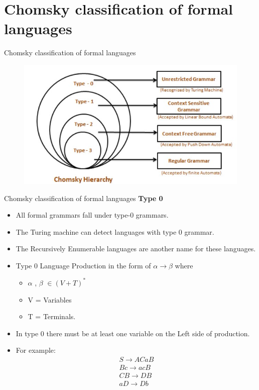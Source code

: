 \documentclass{beamer}
\begin{document}
\section{Chomsky classification of formal languages}
\begin{frame}{Chomsky classification of formal languages}
		\begin{figure}
		\includegraphics[scale=.8]{img5/m34}
	\end{figure}
\end{frame}
\begin{frame}{Chomsky classification of formal languages}
\textbf{Type 0}
\begin{itemize}
	\item All formal grammars fall under type-0 grammars.
	\item The Turing machine can detect languages with type 0 grammar.
	\item The Recursively Enumerable languages are another name for these languages.
	\item Type 0 Language Production in the form of $\alpha \rightarrow \beta$ where
	\begin{itemize}
		\item $\alpha$ , $\beta$  $\in ( V + T)^*$
		\item V = Variables
		\item T = Terminals.
	\end{itemize}
\item 	In type 0 there must be at least one variable on the Left side of production.
\item For example: 
\begin{eqnarray*}
	S \rightarrow ACaB \\
	Bc \rightarrow acB \\
	CB \rightarrow DB \\
	aD \rightarrow Db
\end{eqnarray*}
\end{itemize}

\end{frame}
\end{document}
